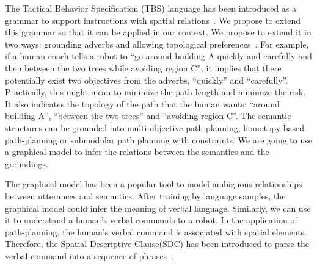 \documentclass[phd]{byuprop}
\begin{document}
The Tactical Behavior Specification (TBS) language has been introduced as a grammar to support instructions with spatial relations~\cite{Boularias_2015_7953}.
We propose to extend this grammar so that it can be applied in our context.
We propose to extend it in two ways: grounding adverbs and allowing topological preferences~\cite{Yi2014}.
For example, if a human coach tells a robot to ``go around building A quickly and carefully and then between the two trees while avoiding region C'',
it implies that there potentially exist two objectives from the adverbs, ``quickly'' and ``carefully''.
Practically, this might mean to minimize the path length and minimize the risk.
It also indicates the topology of the path that the human wants: ``around building A'', ``between the two trees'' and ``avoiding region C''.
The semantic structures can be grounded into multi-objective path planning, homotopy-based path-planning or submodular path planning with constraints.
We are going to use a graphical model to infer the relations between the semantics and the groundings.

The graphical model has been a popular tool to model ambiguous relationships between utterances and semantics.
After training by language samples, the graphical model could infer the meaning of verbal language.
Similarly, we can use it to understand a human's verbal commands to a robot.
In the application of path-planning, the human's verbal command is associated with spatial elements. 
Therefore, the Spatial Descriptive Clause(SDC) has been introduced to parse the verbal command into a sequence of phrases~\cite{Kollar:2010:TUN:1734454.1734553}.
\end{document}
